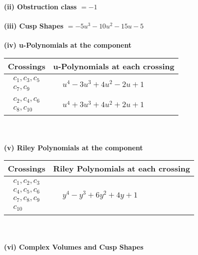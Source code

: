 \documentclass[1p]{elsarticle_modified}
\theoremstyle{definition}
\begin{document}
\flushleft \textbf{(ii) Obstruction class $= -1$}\\~\\
\flushleft \textbf{(iii) Cusp Shapes $= -5 u^3-10 u^2-15 u-5$}\\~\\
\newpage\renewcommand{\arraystretch}{1}
\flushleft \textbf{(iv) u-Polynomials at the component}\newline \\
\begin{tabular}{m{50pt}|m{274pt}}
Crossings & \hspace{64pt}u-Polynomials at each crossing \\
\hline $$\begin{aligned}c_{1},c_{3},c_{5}\\c_{7},c_{9}\end{aligned}$$&$\begin{aligned}
&u^4-3 u^3+4 u^2-2 u+1
\end{aligned}$\\
\hline $$\begin{aligned}c_{2},c_{4},c_{6}\\c_{8},c_{10}\end{aligned}$$&$\begin{aligned}
&u^4+3 u^3+4 u^2+2 u+1
\end{aligned}$\\
\hline
\end{tabular}\\~\\
\newpage\renewcommand{\arraystretch}{1}
\flushleft \textbf{(v) Riley Polynomials at the component}\newline \\
\begin{tabular}{m{50pt}|m{274pt}}
Crossings & \hspace{64pt}Riley Polynomials at each crossing \\
\hline $$\begin{aligned}c_{1},c_{2},c_{3}\\c_{4},c_{5},c_{6}\\c_{7},c_{8},c_{9}\\c_{10}\end{aligned}$$&$\begin{aligned}
&y^4- y^3+6 y^2+4 y+1
\end{aligned}$\\
\hline
\end{tabular}\\~\\
\newpage\flushleft \textbf{(vi) Complex Volumes and Cusp Shapes}
\end{document}

